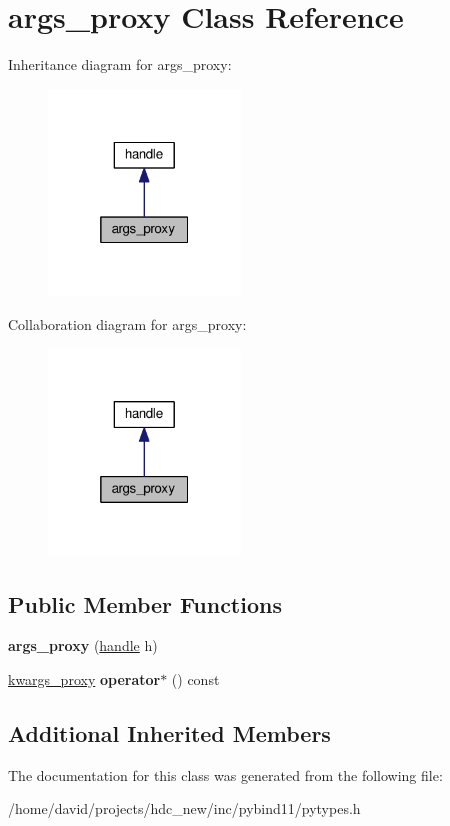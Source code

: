 \hypertarget{classargs__proxy}{}\section{args\+\_\+proxy Class Reference}
\label{classargs__proxy}


Inheritance diagram for args\+\_\+proxy\+:
\nopagebreak
\begin{figure}[H]
\begin{center}
\leavevmode
\includegraphics[width=145pt]{classargs__proxy__inherit__graph}
\end{center}
\end{figure}


Collaboration diagram for args\+\_\+proxy\+:
\nopagebreak
\begin{figure}[H]
\begin{center}
\leavevmode
\includegraphics[width=145pt]{classargs__proxy__coll__graph}
\end{center}
\end{figure}
\subsection*{Public Member Functions}
\begin{DoxyCompactItemize}
\item 
{\bfseries args\+\_\+proxy} (\hyperlink{classhandle}{handle} h)\hypertarget{classargs__proxy_ae573f34702db968299ab9df3cfa13d0d}{}\label{classargs__proxy_ae573f34702db968299ab9df3cfa13d0d}

\item 
\hyperlink{classkwargs__proxy}{kwargs\+\_\+proxy} {\bfseries operator$\ast$} () const \hypertarget{classargs__proxy_a0fb228cbc64332397ebd72372b3399fd}{}\label{classargs__proxy_a0fb228cbc64332397ebd72372b3399fd}

\end{DoxyCompactItemize}
\subsection*{Additional Inherited Members}


The documentation for this class was generated from the following file\+:\begin{DoxyCompactItemize}
\item 
/home/david/projects/hdc\+\_\+new/inc/pybind11/pytypes.\+h\end{DoxyCompactItemize}

